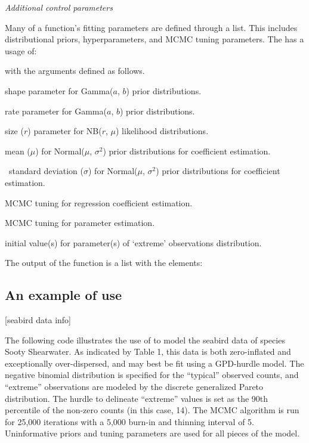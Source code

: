 \documentclass[article]{jss}
\begin{document}
{\large \textit{Additional control parameters}}

Many of a  function's fitting parameters are defined through a  list. This includes distributional priors, hyperparameters, and MCMC tuning parameters. The  has a usage of:


with the arguments defined as follows.

\begin{description}[labelindent = 1.5cm, leftmargin = 1.5cm]

	\item [\code{a}] shape parameter for Gamma($a$, $b$) prior distributions.
	\item [\code{b}] rate parameter for Gamma($a$, $b$) prior distributions.
	\item [\code{size}] size ($r$) parameter for NB($r$, $\mu$) likelihood distributions.
	\item [\code{beta.prior.mean}] mean ($\mu$) for Normal($\mu$, $\sigma^{2}$) prior distributions for coefficient estimation.
	\item [\code{beta.prior.sd}]\ standard deviation ($\sigma$) for Normal($\mu$, $\sigma^{2}$) prior distributions for coefficient estimation.
	\item [\code{beta.tune}] MCMC tuning for regression coefficient estimation.
	\item [\code{pars.tune}] MCMC tuning for parameter estimation.
	\item [\code{lam.start, mu.start, sigma.start, xi.start}] initial value(s) for parameter(s) of `extreme' observations distribution.

\end{description}

The output of the  function is a list with the elements:

\subsection{An example of use}

[seabird data info] 

The following code illustrates the use of  to model the seabird data of species Sooty Shearwater. As indicated by Table 1, this data is both zero-inflated and exceptionally over-dispersed, and may best be fit using a GPD-hurdle model. The negative binomial distribution is specified for the ``typical'' observed counts, and ``extreme'' observations are modeled by the discrete generalized Pareto distribution. The hurdle to delineate ``extreme'' values is set as the 90th percentile of the non-zero counts (in this case, 14). The MCMC algorithm is run for 25,000 iterations with a 5,000 burn-in and thinning interval of 5. Uninformative priors and tuning parameters are used for all pieces of the model.
\end{document}
